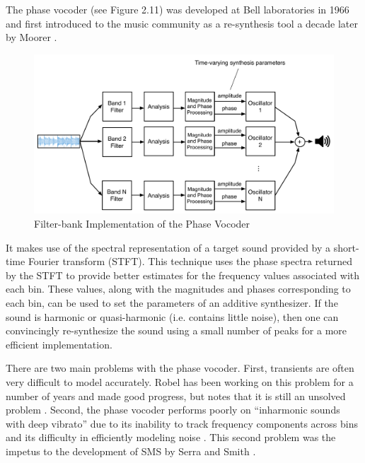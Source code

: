 \documentclass[12pt]{report} 	%
\numberwithin{figure}{chapter}
\numberwithin{table}{chapter}
\numberwithin{equation}{chapter}
\begin{document}
\begin{flushleft}
The phase vocoder (see Figure 2.11) was developed at Bell laboratories in 1966 and first introduced to the music community as a re-synthesis tool a decade later by Moorer \cite{Moorer:1978ge}. \begin{figure}[h!]
\begin{center}
\includegraphics[scale=0.45]{PhaseVocoder}
\caption[Phase vocoder]{Filter-bank Implementation of the Phase Vocoder}
\end{center}
\end{figure}
It makes use of the spectral representation of a target sound provided by a short-time Fourier transform (STFT). This technique uses the phase spectra returned by the STFT to provide better estimates for the frequency values associated with each bin. These values, along with the magnitudes and phases corresponding to each bin, can be used to set the parameters of an additive synthesizer. If the sound is harmonic or quasi-harmonic (i.e. contains little noise), then one can convincingly re-synthesize the sound using a small number of peaks for a more efficient implementation. 

There are two main problems with the phase vocoder. First, transients are often very difficult to model accurately. Robel has been working on this problem for a number of years \cite{Robel:2003vh,Robel:2010dp} and made good progress, but notes that it is still an unsolved problem \cite[p. 1]{Robel:2010dp}. Second, the phase vocoder performs poorly on ``inharmonic sounds with deep vibrato'' due to its inability to track frequency components across bins and its difficulty in efficiently modeling noise \cite[p. 13]{Serra:1990dk}. This second problem was the impetus to the development of SMS by Serra and Smith \cite{Serra:1990dk}.


\end{flushleft}
\end{document}
